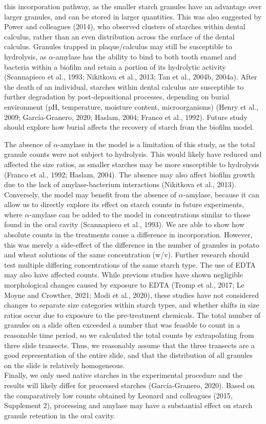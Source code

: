 \documentclass[utf8]{../templates/frontiersSCNS}
\begin{document}
this incorporation pathway, as the smaller starch granules have an advantage over
larger granules, and can be stored in larger quantities.
This was also suggested by Power and colleagues (2014), who
observed clusters of starches within dental calculus, rather than an even
distribution across the surface of the dental calculus.
Granules trapped
in plaque/calculus may still be susceptible to hydrolysis, as \(\alpha\)-amylase has
the ability to bind to both tooth enamel and bacteria within a biofilm and retain
a portion of its hydrolytic activity
(Scannapieco et al., 1993; Nikitkova et al., 2013; Tan et al., 2004b, 2004a).
After the death of an individual, starches within dental calculus are susceptible
to further degradation by post-depositional processes, depending on burial environment
(pH, temperature, moisture content, microorganisms)
(Henry et al., 2009; García-Granero, 2020; Haslam, 2004; Franco et al., 1992).
Future study should explore how burial affects the recovery of starch from the
biofilm model.

The absence of \(\alpha\)-amylase in the model is a limitation of this study, as
the total granule counts were not subject to hydrolysis. This would likely have
reduced and affected the size ratios, as smaller starches may be more
susceptible to hydrolysis
(Franco et al., 1992; Haslam, 2004). The absence may
also affect biofilm growth due to the lack of amylase-bacterium interactions
(Nikitkova et al., 2013). Conversely, the model may benefit from the
absence of \(\alpha\)-amylase, because it can allow us to directly explore
its effect on starch counts in future experiments, where \(\alpha\)-amylase can be
added to the model in concentrations similar to those found in the oral cavity
(Scannapieco et al., 1993).
We are able to show how absolute counts in the treatments cause a difference in
incorporation. However, this
was merely a side-effect of the difference in the number of granules in potato and
wheat solutions of the same concentration (w/v). Further research should test
multiple differing concentrations of the same starch type.
The use of EDTA may also have affected counts. While previous studies have shown
negligible morphological changes caused by exposure to EDTA
(Tromp et al., 2017; Le Moyne and Crowther, 2021; Modi et al., 2020),
these studies have not considered changes to separate size
categories within starch types, and whether shifts in size ratios occur due to
exposure to the pre-treatment chemicals.
The total number of granules on a slide often exceeded a number that
was feasible to count in a reasonable time period, so we calculated the total
counts by extrapolating from three slide transects.
Thus, we reasonably assume that the three transects are a good representation
of the entire slide, and that the distribution of all granules on the slide is
relatively homogeneous.\\
Finally, we only used native starches in the experimental procedure and the results
will likely differ for processed starches (García-Granero, 2020).
Based on the comparatively low counts obtained by Leonard
and colleagues (2015, Supplement 2), processing and amylase
may have a substantial effect on starch granule retention in the oral cavity.
\end{document}
